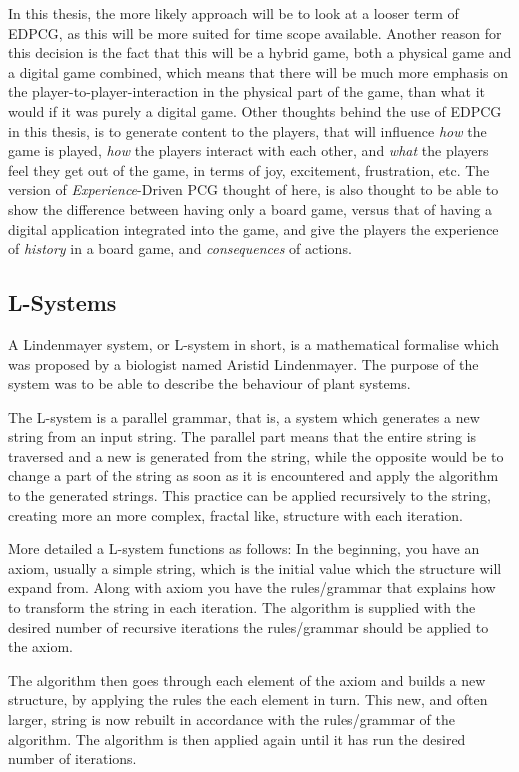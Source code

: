 In this thesis, the more likely approach will be to look at a looser term of EDPCG, as this will be more suited for time scope available.
Another reason for this decision is the fact that this will be a hybrid game, both a physical game and a digital game combined, which means that there will be much more emphasis on the player-to-player-interaction in the physical part of the game, than what it would if it was purely a digital game. Other thoughts behind the use of EDPCG in this thesis, is to generate content to the players, that will influence \textit{how} the game is played, \textit{how} the players interact with each other, and \textit{what} the players feel they get out of the game, in terms of joy, excitement, frustration, etc. 
The version of \textit{Experience}-Driven PCG thought of here, is also thought to be able to show the difference between having only a board game, versus that of having a digital application integrated into the game, and give the players the experience of \textit{history} in a board game, and \textit{consequences} of actions.

\subsection{L-Systems}
A Lindenmayer system, or L-system in short, is a mathematical formalise which was proposed by a biologist named Aristid Lindenmayer\cite{web:lsys}. The purpose of the system was to be able to describe the behaviour of plant systems.

The L-system is a parallel grammar, that is, a system which generates a new string from an input string. The parallel part means that the entire string is traversed and a new is generated from the string, while the opposite would be to change a part of the string as soon as it is encountered and apply the algorithm to the generated strings. 
This practice can be applied recursively to the string, creating more an more complex, fractal like, structure with each iteration. 

More detailed a L-system functions as follows:
In the beginning, you have an axiom, usually a simple string, which is the initial value which the structure will expand from.
Along with axiom you have the rules/grammar that explains how to transform the string in each iteration. 
The algorithm is supplied with the desired number of recursive iterations the rules/grammar should be applied to the axiom.

The algorithm then goes through each element of the axiom and builds a new structure, by applying the rules the each element in turn. This new, and often larger, string is now rebuilt in accordance with the rules/grammar of the algorithm.
The algorithm is then applied again until it has run the desired number of iterations.

